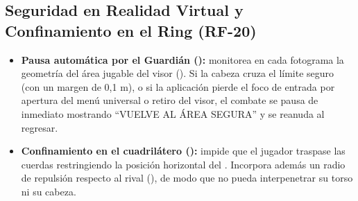 \subsection{Seguridad en Realidad Virtual y Confinamiento en el Ring (RF-20)}
\begin{itemize}
  \item \textbf{Pausa automática por el Guardián ():} monitorea en cada fotograma la geometría del área jugable del visor (). Si la cabeza cruza el límite seguro (con un margen de 0,1 m), o si la aplicación pierde el foco de entrada por apertura del menú universal o retiro del visor, el combate se pausa de inmediato mostrando ``VUELVE AL ÁREA SEGURA'' y se reanuda al regresar.
  \item \textbf{Confinamiento en el cuadrilátero ():} impide que el jugador traspase las cuerdas restringiendo la posición horizontal del . Incorpora además un radio de repulsión respecto al rival (), de modo que no pueda interpenetrar su torso ni su cabeza.
\end{itemize}

